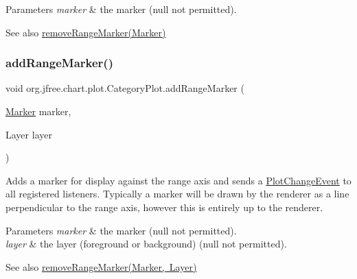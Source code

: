 \begin{DoxyParams}{Parameters}
{\em marker} & the marker ({\ttfamily null} not permitted).\\
\hline
\end{DoxyParams}
\begin{DoxySeeAlso}{See also}
\mbox{\hyperlink{classorg_1_1jfree_1_1chart_1_1plot_1_1_category_plot_a3531bdfbf6ce80dd9de8f2dab5fcc61a}{remove\+Range\+Marker(\+Marker)}} 
\end{DoxySeeAlso}
\mbox{\label{classorg_1_1jfree_1_1chart_1_1plot_1_1_category_plot_a231e8e9773d07ab24d15452adf8bea19}} 
\subsubsection{\texorpdfstring{add\+Range\+Marker()}{addRangeMarker()}\hspace{0.1cm}{\footnotesize\ttfamily [2/4]}}
{\footnotesize\ttfamily void org.\+jfree.\+chart.\+plot.\+Category\+Plot.\+add\+Range\+Marker (\begin{DoxyParamCaption}\item[{\mbox{\hyperlink{classorg_1_1jfree_1_1chart_1_1plot_1_1_marker}{Marker}}}]{marker,  }\item[{Layer}]{layer }\end{DoxyParamCaption})}

Adds a marker for display against the range axis and sends a \mbox{\hyperlink{}{Plot\+Change\+Event}} to all registered listeners. Typically a marker will be drawn by the renderer as a line perpendicular to the range axis, however this is entirely up to the renderer.


\begin{DoxyParams}{Parameters}
{\em marker} & the marker ({\ttfamily null} not permitted). \\
\hline
{\em layer} & the layer (foreground or background) ({\ttfamily null} not permitted).\\
\hline
\end{DoxyParams}
\begin{DoxySeeAlso}{See also}
\mbox{\hyperlink{classorg_1_1jfree_1_1chart_1_1plot_1_1_category_plot_adb5a2b51c5ccf0145d3170da5c686ff5}{remove\+Range\+Marker(\+Marker, Layer)}} 
\end{DoxySeeAlso}
\mbox{\label{classorg_1_1jfree_1_1chart_1_1plot_1_1_category_plot_a250168a71cfe48c6c97003806a3a585b}} 
